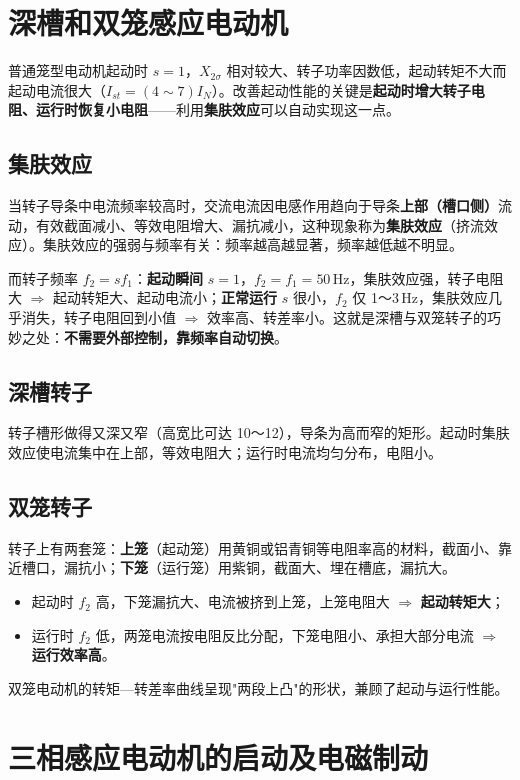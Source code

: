 \section{深槽和双笼感应电动机}

普通笼型电动机起动时 $s=1$，$X_{2\sigma}$ 相对较大、转子功率因数低，起动转矩不大而起动电流很大（$I_{st}=(4\sim7)I_N$）。改善起动性能的关键是\textbf{起动时增大转子电阻、运行时恢复小电阻}——利用\textbf{集肤效应}可以自动实现这一点。

\subsection{集肤效应}
当转子导条中电流频率较高时，交流电流因电感作用趋向于导条\textbf{上部（槽口侧）}流动，有效截面减小、等效电阻增大、漏抗减小，这种现象称为\textbf{集肤效应}（挤流效应）。集肤效应的强弱与频率有关：频率越高越显著，频率越低越不明显。

而转子频率 $f_2=sf_1$：\textbf{起动瞬间} $s=1$，$f_2=f_1=50$\,Hz，集肤效应强，转子电阻大 $\Rightarrow$ 起动转矩大、起动电流小；\textbf{正常运行} $s$ 很小，$f_2$ 仅 1～3\,Hz，集肤效应几乎消失，转子电阻回到小值 $\Rightarrow$ 效率高、转差率小。这就是深槽与双笼转子的巧妙之处：\textbf{不需要外部控制，靠频率自动切换}。

\subsection{深槽转子}
转子槽形做得又深又窄（高宽比可达 10～12），导条为高而窄的矩形。起动时集肤效应使电流集中在上部，等效电阻大；运行时电流均匀分布，电阻小。

\subsection{双笼转子}
转子上有两套笼：\textbf{上笼}（起动笼）用黄铜或铝青铜等电阻率高的材料，截面小、靠近槽口，漏抗小；\textbf{下笼}（运行笼）用紫铜，截面大、埋在槽底，漏抗大。
\begin{itemize}
  \item 起动时 $f_2$ 高，下笼漏抗大、电流被挤到上笼，上笼电阻大 $\Rightarrow$ \textbf{起动转矩大}；
  \item 运行时 $f_2$ 低，两笼电流按电阻反比分配，下笼电阻小、承担大部分电流 $\Rightarrow$ \textbf{运行效率高}。
\end{itemize}
双笼电动机的转矩—转差率曲线呈现"两段上凸"的形状，兼顾了起动与运行性能。

\section{三相感应电动机的启动及电磁制动}


